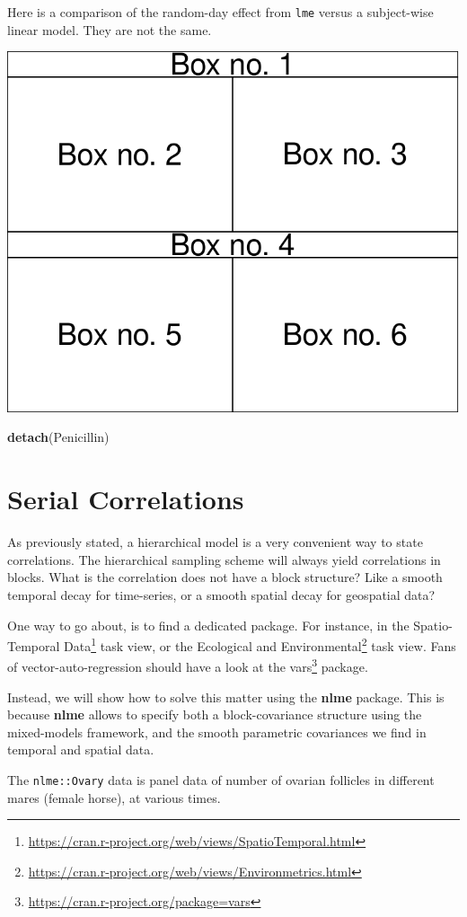 \documentclass[]{book}
\newenvironment{Shaded}{\begin{snugshade}}{\end{snugshade}}
\newcommand{\KeywordTok}[1]{\textcolor[rgb]{0.13,0.29,0.53}{\textbf{#1}}}
\newcommand{\NormalTok}[1]{#1}
\renewcommand{\href}[2]{#2\footnote{\url{#1}}}
\theoremstyle{definition}
\theoremstyle{definition}
\theoremstyle{definition}
\theoremstyle{remark}
\begin{document}
Here is a comparison of the random-day effect from \texttt{lme} versus a subject-wise linear model. They are not the same.

\includegraphics[width=0.5\linewidth]{Rcourse_files/figure-latex/unnamed-chunk-215-1}

\begin{Shaded}
\begin{Highlighting}[]
\KeywordTok{detach}\NormalTok{(Penicillin)}
\end{Highlighting}
\end{Shaded}

\hypertarget{serial}{%
\section{Serial Correlations}\label{serial}}

As previously stated, a hierarchical model is a very convenient way to state correlations.
The hierarchical sampling scheme will always yield correlations in blocks.
What is the correlation does not have a block structure?
Like a smooth temporal decay for time-series, or a smooth spatial decay for geospatial data?

One way to go about, is to find a dedicated package.
For instance, in the \href{https://cran.r-project.org/web/views/SpatioTemporal.html}{Spatio-Temporal Data} task view, or the \href{https://cran.r-project.org/web/views/Environmetrics.html}{Ecological and Environmental} task view.
Fans of vector-auto-regression should have a look at the \href{https://cran.r-project.org/package=vars}{vars} package.

Instead, we will show how to solve this matter using the \textbf{nlme} package.
This is because \textbf{nlme} allows to specify both a block-covariance structure using the mixed-models framework, and the smooth parametric covariances we find in temporal and spatial data.

The \texttt{nlme::Ovary} data is panel data of number of ovarian follicles in different mares (female horse), at various times.
\end{document}
